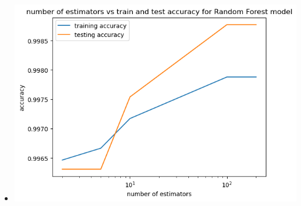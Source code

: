\documentclass{article}
\theoremstyle{plain}
\theoremstyle{definition}
\begin{document}
\begin{enumerate}
 \begin{itemize}
           \color{blue}
               \item \includegraphics[width=15cm]{homework/homework_6/images/hw6_6.png}
\end{itemize}




\end{enumerate}
\end{document}
